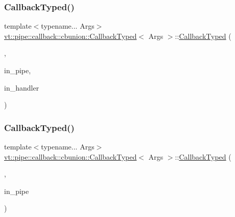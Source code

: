 \subsubsection{\texorpdfstring{Callback\+Typed()}{CallbackTyped()}\hspace{0.1cm}{\footnotesize\ttfamily [5/12]}}
{\footnotesize\ttfamily template$<$typename... Args$>$ \\
\hyperlink{structvt_1_1pipe_1_1callback_1_1cbunion_1_1_callback_typed}{vt\+::pipe\+::callback\+::cbunion\+::\+Callback\+Typed}$<$ Args $>$\+::\hyperlink{structvt_1_1pipe_1_1callback_1_1cbunion_1_1_callback_typed}{Callback\+Typed} (\begin{DoxyParamCaption}\item[{Raw\+Bcast\+Msg\+Tag\+Type}]{,  }\item[{\hyperlink{namespacevt_ac9852acda74d1896f48f406cd72c7bd3}{Pipe\+Type} const \&}]{in\+\_\+pipe,  }\item[{\hyperlink{namespacevt_af64846b57dfcaf104da3ef6967917573}{Handler\+Type} const}]{in\+\_\+handler }\end{DoxyParamCaption})\hspace{0.3cm}{\ttfamily [inline]}}

\mbox{\label{structvt_1_1pipe_1_1callback_1_1cbunion_1_1_callback_typed_a9923c7ce924c0f2d52cdd19a69dfcfec}} 
\subsubsection{\texorpdfstring{Callback\+Typed()}{CallbackTyped()}\hspace{0.1cm}{\footnotesize\ttfamily [6/12]}}
{\footnotesize\ttfamily template$<$typename... Args$>$ \\
\hyperlink{structvt_1_1pipe_1_1callback_1_1cbunion_1_1_callback_typed}{vt\+::pipe\+::callback\+::cbunion\+::\+Callback\+Typed}$<$ Args $>$\+::\hyperlink{structvt_1_1pipe_1_1callback_1_1cbunion_1_1_callback_typed}{Callback\+Typed} (\begin{DoxyParamCaption}\item[{Raw\+Anon\+Tag\+Type}]{,  }\item[{\hyperlink{namespacevt_ac9852acda74d1896f48f406cd72c7bd3}{Pipe\+Type} const \&}]{in\+\_\+pipe }\end{DoxyParamCaption})\hspace{0.3cm}{\ttfamily [inline]}}

